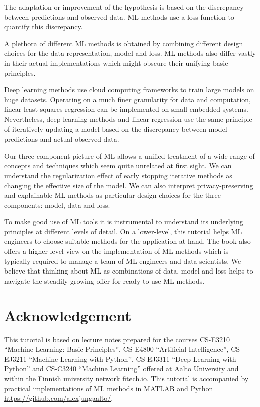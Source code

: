 \documentclass[12pt]{report}
\begin{document}
The adaptation or improvement of the hypothesis is based on the discrepancy 
between predictions and observed data. ML methods use a loss function 
to quantify this discrepancy.

A plethora of different ML methods is obtained by combining different design 
choices for the data representation, model and loss. ML methods also differ 
vastly in their actual implementations which might obscure their unifying 
basic principles. 

Deep learning methods use cloud computing frameworks to train large 
models on huge datasets. Operating on a much finer granularity for 
data and computation, linear least squares regression can be implemented 
on small embedded systems. Nevertheless, deep learning methods and 
linear regression use the same principle of iteratively updating a model 
based on the discrepancy between model predictions and actual observed 
data. 

Our three-component picture of ML allows a unified treatment of a 
wide range of concepts and techniques which seem quite unrelated 
at first sight. We can understand the regularization effect of early stopping 
iterative methods as changing the effective size of the model. We can also 
interpret privacy-preserving and explainable ML methods as particular design 
choices for the three components: model, data and loss. 

To make good use of ML tools it is instrumental to understand 
its underlying principles at different levels of detail. On a lower-level, 
this tutorial helps ML engineers to choose suitable methods for 
the application at hand. The book also offers a higher-level view 
on the implementation of ML methods which is typically required 
to manage a team of ML engineers and data scientists. We believe 
that thinking about ML as combinations of data, model and loss 
helps to navigate the steadily growing offer for ready-to-use ML methods. 

\section*{Acknowledgement}
This tutorial is based on lecture notes prepared for the 
courses CS-E3210 ``Machine Learning: Basic Principles'', 
CS-E4800 ``Artificial Intelligence'', CS-EJ3211 ``Machine 
Learning with Python'', CS-EJ3311 ``Deep Learning with Python'' 
and CS-C3240 ``Machine Learning'' offered at Aalto 
University and within the Finnish university network 
\url{fitech.io}. This tutorial is accompanied by practical 
implementations of ML methods in MATLAB and 
Python \url{https://github.com/alexjungaalto/}. 
\end{document}
